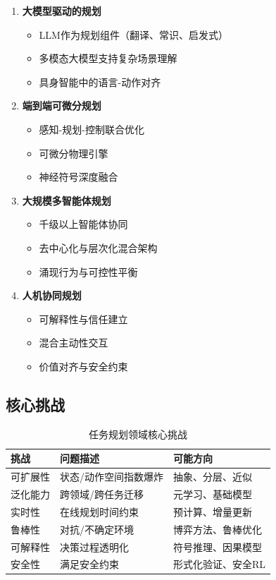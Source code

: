 \documentclass[12pt,a4paper]{ctexart}
\begin{document}
\begin{enumerate}[leftmargin=2em]
    \item \textbf{大模型驱动的规划}
    \begin{itemize}
        \item LLM作为规划组件（翻译、常识、启发式）
        \item 多模态大模型支持复杂场景理解
        \item 具身智能中的语言-动作对齐
    \end{itemize}

    \item \textbf{端到端可微分规划}
    \begin{itemize}
        \item 感知-规划-控制联合优化
        \item 可微分物理引擎
        \item 神经符号深度融合
    \end{itemize}

    \item \textbf{大规模多智能体规划}
    \begin{itemize}
        \item 千级以上智能体协同
        \item 去中心化与层次化混合架构
        \item 涌现行为与可控性平衡
    \end{itemize}

    \item \textbf{人机协同规划}
    \begin{itemize}
        \item 可解释性与信任建立
        \item 混合主动性交互
        \item 价值对齐与安全约束
    \end{itemize}
\end{enumerate}

\subsection{核心挑战}

\begin{table}[htbp]
\centering
\caption{任务规划领域核心挑战}
\begin{tabular}{p{3cm}p{4cm}p{4.5cm}}
\toprule
\textbf{挑战} & \textbf{问题描述} & \textbf{可能方向} \\
\midrule
可扩展性 & 状态/动作空间指数爆炸 & 抽象、分层、近似 \\
泛化能力 & 跨领域/跨任务迁移 & 元学习、基础模型 \\
实时性 & 在线规划时间约束 & 预计算、增量更新 \\
鲁棒性 & 对抗/不确定环境 & 博弈方法、鲁棒优化 \\
可解释性 & 决策过程透明化 & 符号推理、因果模型 \\
安全性 & 满足安全约束 & 形式化验证、安全RL \\
\bottomrule
\end{tabular}
\end{table}
\end{document}
